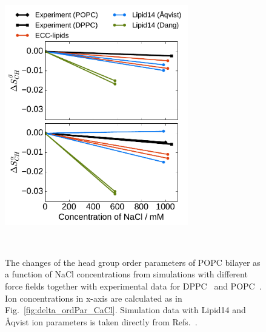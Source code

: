 \documentclass[aip,jcp,twocolumn]{revtex4}
\begin{document}
\begin{figure}[tbp]
  \centering
  \includegraphics[width=8.0cm]{../Fig/ipython_nb/OrdPars-A-B_L14-ECCL17_q80_sig89_NaCl.pdf}
  \caption{\label{fig:delta_ordPar_NaCl}
    The changes of the head group order parameters of POPC bilayer as a function of NaCl concentrations
    from simulations with different force fields together with experimental data for DPPC~\cite{akutsu81} and POPC~\cite{altenbach84}.
    Ion concentrations in x-axis are calculated as in Fig.~\ref{fig:delta_ordPar_CaCl}.
    Simulation data with Lipid14 and \AA{}qvist ion parameters is taken directly from
    Refs.~\cite{lipid14POPC0mMNaClfiles,lipid14POPC1000mMNaClfiles}.
  }
   \\
\end{figure}
\end{document}
